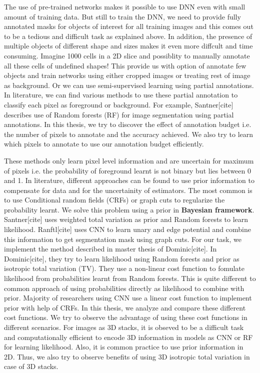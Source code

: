 The use of pre-trained networks makes it possible to use DNN even with small amount of training data. But still to train the DNN, we need to provide fully annotated masks for objects of interest for all training images and this comes out to be a tedious and difficult task as explained above. In addition, the presence of multiple objects of different shape and sizes makes it even more diffcult and time consuming. Imagine 1000 cells in a 2D slice and possiblity to manually annotate all these cells of undefined shapes! This provide us with option of annotate few objects and train networks using either cropped images or treating rest of image as background. Or we can use semi-supervised learning using partial annotations. In literature, we can find various methods to use these partial annotation to classify each pixel as foreground or background. For example, Santner[cite] describes use of Random forests (RF) for image segmentation using partial annotations. In this thesis, we try to discover the effect of annotation budget i.e. the number of pixels to annotate and the accuracy achieved. We also try to learn which pixels to annotate to use our annotation budget efficiently. 

These methods only learn pixel level information and are uncertain for maximum of pixels i.e. the probability of foreground learnt is not binary but lies between 0 and 1. In literature, different approaches can be found to use prior information to compensate for data and for the uncertainity of estimators. The most common is to use Conditional random fields (CRFs) or graph cuts to regularize the probability learnt. We solve this problem using a prior in \textbf{Bayesian framework}. Santner[cite] uses weighted total variation as prior and Random forests to learn likelihood. Ranftl[cite] uses CNN to learn unary and edge potential and combine this information to get segmentation mask using graph cuts. For our task, we implement the method described in master thesis of Dominic[cite]. In Dominic[cite], they try to learn likelihood using Random forests and prior as isotropic total variation (TV). They use a non-linear cost function to fomulate likelihood from probabilities learnt from Random forests. This is quite different to common approach of using probabilities directly as likelihood to combine with prior. Majority of researchers using CNN use a linear cost function to implement prior with help of CRFs. In this thesis, we analyze and compare these different cost functions. We try to observe the advantage of using these cost functions in different scenarios. For images as 3D stacks, it is obseved to be a difficult task and computationally efficient to encode 3D information in models as CNN or RF for learning likelihood. Also, it is common practice to use prior information in 2D. Thus, we also try to observe benefits of using 3D isotropic total variation in case of 3D stacks. \par

